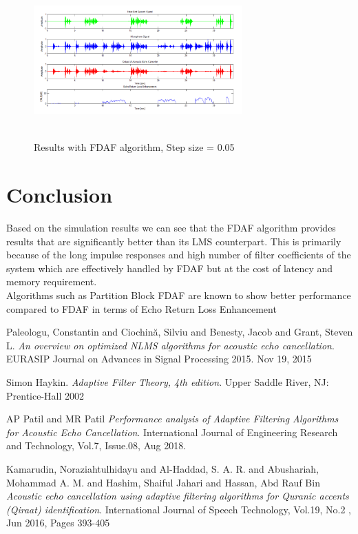 \documentclass[conference]{IEEEtran}
\begin{document}
	\begin{figure}
		\includegraphics[height=6cm, width=8cm]{FDAF_Result_5e-2}
		\caption{Results with FDAF algorithm, Step size = 0.05}
	\end{figure}


\section{Conclusion}
Based on the simulation results we can see that the FDAF algorithm provides results that are significantly better than its LMS counterpart. This is primarily because of the long impulse responses and high number of filter coefficients of the system which are effectively handled by FDAF but at the cost of latency and memory requirement.\\
Algorithms such as Partition Block FDAF are known to show better performance compared to FDAF in terms of Echo Return Loss Enhancement

\begin{thebibliography}{1}
Paleologu, Constantin and Ciochin{\u{a}}, Silviu and Benesty, Jacob
and Grant, Steven L. \textit{An overview on optimized NLMS algorithms for acoustic echo cancellation}. 
EURASIP Journal on Advances in Signal Processing 2015. Nov 19, 2015

Simon Haykin. \textit{Adaptive Filter Theory, 4th edition}. 
Upper Saddle River, NJ: Prentice-Hall 2002

AP Patil and MR Patil \textit{Performance analysis of Adaptive Filtering Algorithms for Acoustic Echo Cancellation}. 
International Journal of Engineering Research and Technology, Vol.7, Issue.08, Aug 2018.

Kamarudin, Noraziahtulhidayu and Al-Haddad, S. A. R. and Abushariah, Mohammad A. M. and Hashim, Shaiful Jahari and Hassan, Abd Rauf Bin \textit{Acoustic echo cancellation using adaptive filtering algorithms for Quranic accents (Qiraat) identification}. 
International Journal of Speech Technology, Vol.19, No.2 , Jun 2016, Pages 393-405
\end{thebibliography}
\smallskip
\end{document}
